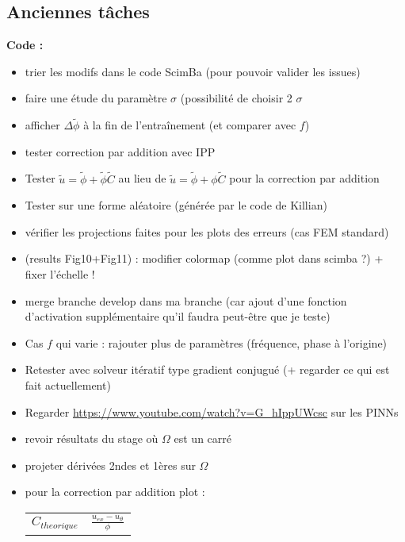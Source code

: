 \subsection*{Anciennes tâches}

\textbf{Code :}
\begin{itemize}[label=$\square$] 
	\item[\previous{5}] trier les modifs dans le code ScimBa (pour pouvoir valider les issues)
	\item[\previous{5}] faire une étude du paramètre $\sigma$ (possibilité de choisir 2 $\sigma$
	\item[\previous{5}] afficher $\Delta \tilde{\phi}$ à la fin de l'entraînement (et comparer avec $f$)
	\item[\previous{5}] tester correction par addition avec IPP
	\item[\previous{5}] Tester $\tilde{u}=\tilde{\phi}+\tilde{\phi}\tilde{C}$ au lieu de $\tilde{u}=\tilde{\phi}+\phi\tilde{C}$ pour la correction par addition
	\item[\previous{5}] Tester sur une forme aléatoire (générée par le code de Killian)
	\item[\previous{6}] vérifier les projections faites pour les plots des erreurs (cas FEM standard)
	\item[\previous{6}] (results Fig10+Fig11) : modifier colormap (comme plot dans scimba ?) + fixer l'échelle !
	\item[\previous{6}] merge branche develop dans ma branche (car ajout d'une fonction d'activation supplémentaire qu'il faudra peut-être que je teste)
	\item[\previous{6}] Cas $f$ qui varie : rajouter plus de paramètres (fréquence, phase à l'origine) 
	\item[\previous{6}] Retester avec solveur itératif type gradient conjugué (+ regarder ce qui est fait actuellement)
	\item[\previous{6}] Regarder \url{https://www.youtube.com/watch?v=G_hIppUWcsc} sur les PINNs
	\item[\previous{7}] revoir résultats du stage où $\Omega$ est un carré
	\item[\previous{7}] projeter dérivées 2ndes et 1ères sur $\Omega$
	\item[\previous{7}] pour la correction par addition plot : \\
	\begin{minipage}{0.48\linewidth}
		\begin{tabular}[\linewidth]{lc}
			$C_{theorique}$ & $\frac{u_{ex}-u_\theta}{\phi}$ \\

\end{tabular}
\end{minipage}
\end{itemize}

